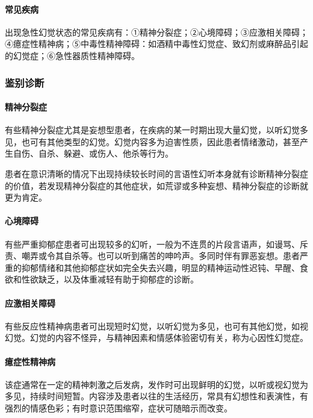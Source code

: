 \paragraph{常见疾病}

出现急性幻觉状态的常见疾病有：①精神分裂症；②心境障碍；③应激相关障碍；④癔症性精神病；⑤中毒性精神障碍：如酒精中毒性幻觉症、致幻剂或麻醉品引起的幻觉症；⑥急性器质性精神障碍。

\subsubsection{鉴别诊断}

\paragraph{精神分裂症}

有些精神分裂症尤其是妄想型患者，在疾病的某一时期出现大量幻觉，以听幻觉多见，也可有其他类型的幻觉。幻觉内容多为迫害性质，因此患者情绪激动，甚至产生自伤、自杀、躲避、或伤人、他杀等行为。

患者在意识清晰的情况下出现持续较长时间的言语性幻听本身就有诊断精神分裂症的价值，若发现精神分裂症的其他症状，如荒谬或多种妄想、精神分裂症的诊断就更为肯定。

\paragraph{心境障碍}

有些严重抑郁症患者可出现较多的幻听，一般为不连贯的片段言语声，如谩骂、斥责、嘲弄或令其自杀等。也可以听到痛苦的呻吟声。多同时伴有罪恶妄想。患者严重的抑郁情绪和其他抑郁症状如完全失去兴趣，明显的精神运动性迟钝、早醒、食欲和性欲缺乏，以及体重减轻有助于抑郁症的诊断。

\paragraph{应激相关障碍}

有些反应性精神病患者可出现短时幻觉，以听幻觉为多见，也可有其他幻觉，如视幻觉。幻觉的内容不怪异，与精神因素和情感体验密切有关，称为心因性幻觉症。

\paragraph{癔症性精神病}

该症通常在一定的精神刺激之后发病，发作时可出现鲜明的幻觉，以听或视幻觉为多见，持续时间短暂。内容涉及患者以往的生活经历，常具有幻想性和表演性，有强烈的情感色彩；有时意识范围缩窄，症状可随暗示而改变。

